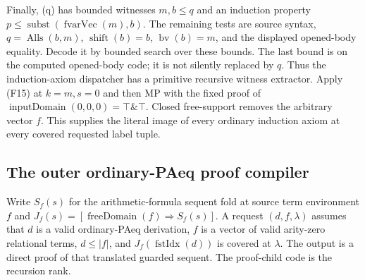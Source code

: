 Finally, (q) has bounded witnesses
$m,b\le q$ and an induction property
$p\le\operatorname{subst}(\operatorname{fvarVec}(m),b)$.
The remaining tests are source syntax, $q=\operatorname{Alls}(b,m)$,
$\operatorname{shift}(b)=b$, $\operatorname{bv}(b)=m$, and the
displayed opened-body equality.  Decode it by bounded search over
these bounds.  The last bound is on the computed opened-body code;
it is not silently replaced by $q$.  Thus the induction-axiom
dispatcher has a primitive recursive witness extractor.
Apply (F15) at $k=m,s=0$ and then MP with the fixed proof of
$\operatorname{inputDomain}(0,0,0)=\top\mathbin\&\top$.
Closed free-support removes the arbitrary vector $f$.  This supplies
the literal  image of every ordinary induction
axiom at every covered requested label tuple.

\subsection{The outer ordinary-PAeq proof compiler}

Write $S_f(s)$ for the arithmetic-formula sequent fold at source
term environment $f$ and
$J_f(s)=[\operatorname{freeDomain}(f)\Rightarrow S_f(s)]$.
A request $(d,f,\lambda)$ assumes that $d$ is a valid ordinary-PAeq
derivation, $f$ is a vector of valid arity-zero relational terms,
$d\le|f|$, and $J_f(\operatorname{fstIdx}(d))$ is covered at
$\lambda$.  The output is a direct proof of that translated
guarded sequent.  The proof-child code is the recursion rank.

